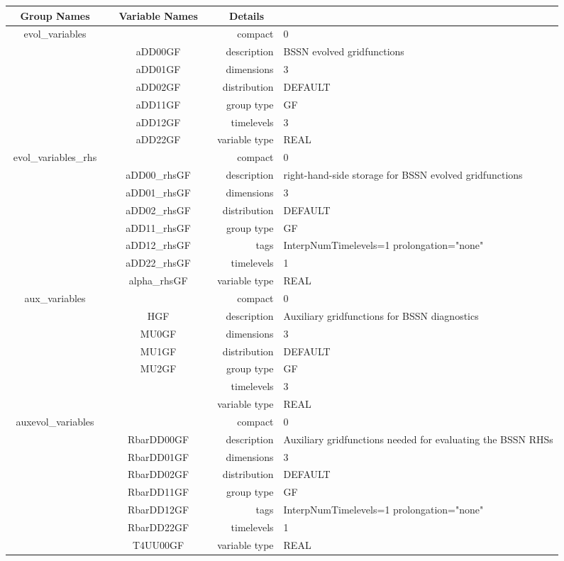 \begin{tabular*}{150mm}{|c|c@{\extracolsep{\fill}}|rl|} \hline 
~ {\bf Group Names} ~ & ~ {\bf Variable Names} ~  &{\bf Details} ~ & ~\\ 
\hline 
evol\_variables &  & compact & 0 \\ 
 & aDD00GF & description & BSSN evolved gridfunctions \\ 
 & aDD01GF & dimensions & 3 \\ 
 & aDD02GF & distribution & DEFAULT \\ 
 & aDD11GF & group type & GF \\ 
 & aDD12GF & timelevels & 3 \\ 
 & aDD22GF & variable type & REAL \\ 
\hline 
evol\_variables\_rhs &  & compact & 0 \\ 
 & aDD00\_rhsGF & description & right-hand-side storage for BSSN evolved gridfunctions \\ 
 & aDD01\_rhsGF & dimensions & 3 \\ 
 & aDD02\_rhsGF & distribution & DEFAULT \\ 
 & aDD11\_rhsGF & group type & GF \\ 
 & aDD12\_rhsGF & tags & InterpNumTimelevels=1 prolongation="none" \\ 
 & aDD22\_rhsGF & timelevels & 1 \\ 
 & alpha\_rhsGF & variable type & REAL \\ 
\hline 
aux\_variables &  & compact & 0 \\ 
 & HGF & description & Auxiliary gridfunctions for BSSN diagnostics \\ 
 & MU0GF & dimensions & 3 \\ 
 & MU1GF & distribution & DEFAULT \\ 
 & MU2GF & group type & GF \\ 
 &  & timelevels & 3 \\ 
 &  & variable type & REAL \\ 
\hline 
auxevol\_variables &  & compact & 0 \\ 
 & RbarDD00GF & description & Auxiliary gridfunctions needed for evaluating the BSSN RHSs \\ 
 & RbarDD01GF & dimensions & 3 \\ 
 & RbarDD02GF & distribution & DEFAULT \\ 
 & RbarDD11GF & group type & GF \\ 
 & RbarDD12GF & tags & InterpNumTimelevels=1 prolongation="none" \\ 
 & RbarDD22GF & timelevels & 1 \\ 
 & T4UU00GF & variable type & REAL \\ 
\hline 
\end{tabular*} 



